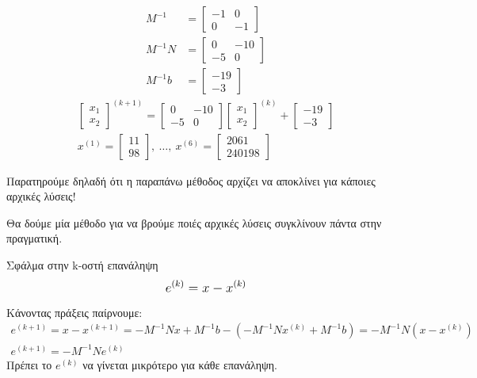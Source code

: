 \documentclass[11pt,a4paper,notitlepage,fleqn,final]{article}
\begin{document}
\begin{align*}
	M^{-1} &= \left[\begin{matrix}
	-1&0\\0&-1
	\end{matrix}\right] \\
	M^{-1}N &= \left[\begin{matrix}
	0&-10\\-5&0
	\end{matrix}\right] \\
	M^{-1}b &= \left[\begin{matrix}
	-19\\-3
	\end{matrix}\right]
\end{align*}
\begin{gather*}
	\left[\begin{matrix}
	x_1\\x_2
	\end{matrix}\right]^{(k+1)}
	= \left[\begin{matrix}
	0&-10\\-5&0
	\end{matrix}\right]\left[\begin{matrix}
	x_1\\x_2
	\end{matrix}\right]^{(k)}+\left[\begin{matrix}
	-19\\-3
	\end{matrix}\right] \\
	x^{(1)} = \left[\begin{matrix}
	11\\98
	\end{matrix}\right],\ \dots,\ x^{(6)} = \left[\begin{matrix}
	2061\\240198
	\end{matrix}\right]
\end{gather*}

Παρατηρούμε δηλαδή ότι η παραπάνω μέθοδος αρχίζει να αποκλίνει για κάποιες
αρχικές λύσεις!

Θα δούμε μία μέθοδο για να βρούμε ποιές αρχικές λύσεις συγκλίνουν πάντα
στην πραγματική.

\begin{defn}{Σφάλμα στην k-οστή επανάληψη}{}
	\[
	\mathlarger{
	e^{(k)} = x-x^{(k)}
    }
	\]
\end{defn}

Κάνοντας πράξεις παίρνουμε:
\begin{gather*}
	e^{(k+1)} = x-x^{(k+1)} = -M^{-1}Nx+M^{-1}b-\left(
	-M^{-1}Nx^{(k)}+M^{-1}b
	\right) = -M^{-1}N\left(x-x^{(k)}\right) \\
	e^{(k+1)} = -M^{-1}Ne^{(k)}
\end{gather*}
Πρέπει το \( e^{(k)} \) να γίνεται μικρότερο για κάθε επανάληψη.
\end{document}
